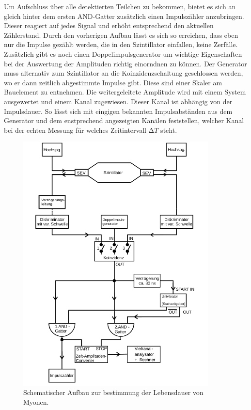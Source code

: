 Um Aufschluss über alle detektierten Teilchen zu bekommen, bietet es sich an gleich hinter dem ersten AND-Gatter zusätzlich einen Impulszähler anzubringen. 
Dieser reagiert auf jedes Signal und erhöht entsprechend den aktuellen Zählerstand. Durch den vorherigen Aufbau lässt es sich so erreichen, dass eben nur die Impulse gezählt werden, die 
in den Szintillator einfallen, keine Zerfälle.
\\
\newline
Zusätzlich gibt es noch einen Doppelimpulsgenerator um wichtige Eigenschaften bei der Auswertung der Amplituden 
richtig einorndnen zu können. Der Generator muss alternativ zum Szintillator an die Koinzidenzschaltung geschlossen werden,
wo er dann zeitlich abgestimmte Impulse gibt. Diese sind einer Skaler am Bauelement zu entnehmen. 
Die weitergeleitete Amplitude wird mit einem System ausgewertet und einem Kanal zugewiesen. Dieser Kanal ist abhängig 
von der Impulsdauer. So lässt sich mit eingigen bekannten Impulsabständen aus dem Generator und dem enstprechend angezeigten Kanälen
feststellen, welcher Kanal bei der echten Messung für welches Zeitintervall $\increment T$ steht.











\begin{figure}
    \centering
    \includegraphics[width=0.9\textwidth]{bilder/aufbau.png}
    \caption{Schematischer Aufbau zur bestimmung der Lebensdauer von Myonen. \cite{skript}} 
    \label{fig:1}
\end{figure}